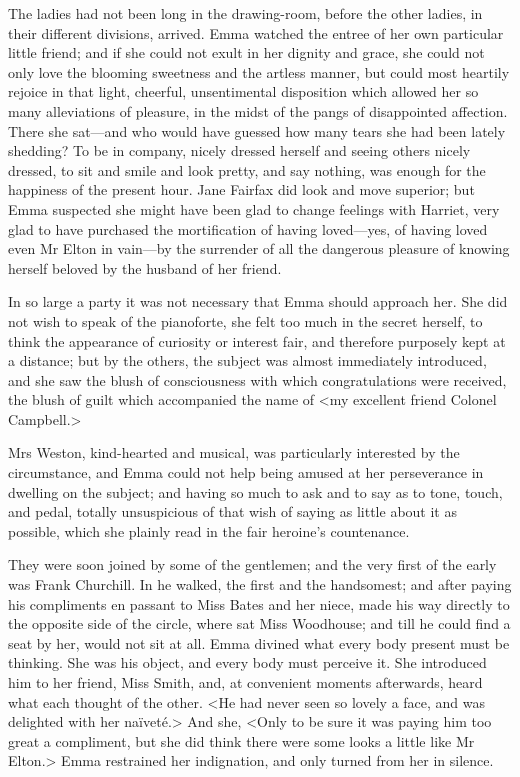 The ladies had not been long in the drawing-room, before the other ladies, in their different divisions, arrived. Emma watched the entree of her own particular little friend; and if she could not exult in her dignity and grace, she could not only love the blooming sweetness and the artless manner, but could most heartily rejoice in that light, cheerful, unsentimental disposition which allowed her so many alleviations of pleasure, in the midst of the pangs of disappointed affection. There she sat—and who would have guessed how many tears she had been lately shedding? To be in company, nicely dressed herself and seeing others nicely dressed, to sit and smile and look pretty, and say nothing, was enough for the happiness of the present hour. Jane Fairfax did look and move superior; but Emma suspected she might have been glad to change feelings with Harriet, very glad to have purchased the mortification of having loved—yes, of having loved even Mr Elton in vain—by the surrender of all the dangerous pleasure of knowing herself beloved by the husband of her friend.

In so large a party it was not necessary that Emma should approach her. She did not wish to speak of the pianoforte, she felt too much in the secret herself, to think the appearance of curiosity or interest fair, and therefore purposely kept at a distance; but by the others, the subject was almost immediately introduced, and she saw the blush of consciousness with which congratulations were received, the blush of guilt which accompanied the name of <my excellent friend Colonel Campbell.>

Mrs Weston, kind-hearted and musical, was particularly interested by the circumstance, and Emma could not help being amused at her perseverance in dwelling on the subject; and having so much to ask and to say as to tone, touch, and pedal, totally unsuspicious of that wish of saying as little about it as possible, which she plainly read in the fair heroine's countenance.

They were soon joined by some of the gentlemen; and the very first of the early was Frank Churchill. In he walked, the first and the handsomest; and after paying his compliments en passant to Miss Bates and her niece, made his way directly to the opposite side of the circle, where sat Miss Woodhouse; and till he could find a seat by her, would not sit at all. Emma divined what every body present must be thinking. She was his object, and every body must perceive it. She introduced him to her friend, Miss Smith, and, at convenient moments afterwards, heard what each thought of the other. <He had never seen so lovely a face, and was delighted with her naïveté.> And she, <Only to be sure it was paying him too great a compliment, but she did think there were some looks a little like Mr Elton.> Emma restrained her indignation, and only turned from her in silence.

